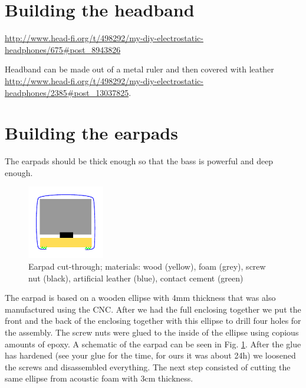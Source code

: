 \documentclass{article}
\begin{document}

\section{Building the headband}
\label{s:headband}

\url{http://www.head-fi.org/t/498292/my-diy-electrostatic-headphones/675#post_8943826}

Headband can be made out of a metal ruler and then covered with leather \url{http://www.head-fi.org/t/498292/my-diy-electrostatic-headphones/2385#post_13037825}.

\section{Building the earpads}
\label{s:pads}
The earpads should be thick enough so that the bass is powerful and deep enough.
\begin{figure}
\centering
\includegraphics[width=0.3\textwidth]{images/earpad.pdf}
\caption{Earpad cut-through; materials: wood (yellow), foam (grey), screw nut (black), artificial leather (blue), contact cement (green)}
\label{f:pads:cut}
\end{figure}
The earpad is based on a wooden ellipse with 4mm thickness that was also manufactured using the CNC. After we had the full enclosing together we put the front and the back of the enclosing together with this ellipse to drill four holes for the assembly. The screw nuts were glued to the inside of the ellipse using copious amounts of epoxy. A schematic of the earpad can be seen in Fig. \ref{f:pads:cut}. After the glue has hardened (see your glue for the time, for ours it was about 24h) we loosened the screws and disassembled everything. The next step consisted of cutting the same ellipse from acoustic foam with 3cm thickness.
\end{document}
